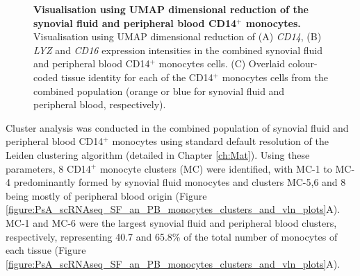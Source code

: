 \begin{figure}[H]
\begin{subfigure}[b]{0.45\textwidth}
\end{subfigure}
\caption[Visualisation using UMAP dimensional reduction of the synovial fluid and peripheral blood CD14$^+$ monocytes.]{\textbf{Visualisation using UMAP dimensional reduction of the synovial fluid and peripheral blood CD14$^+$ monocytes.} Visualisation using UMAP dimensional reduction of (A) \textit{CD14}, (B) \textit{LYZ} and \textit{CD16} expression intensities in the combined synovial fluid and peripheral blood CD14$^+$ monocytes cells. (C) Overlaid colour-coded tissue identity for each of the CD14$^+$ monocytes cells from the combined population (orange or blue for synovial fluid and peripheral blood, respectively).}
\label{figure:PsA_scRNAseq_SF_an_PB_monocytes_markers_and_tissue_identity}
\end{figure}

Cluster analysis was conducted in the combined population of synovial fluid and peripheral blood CD14$^+$ monocytes using standard default resolution of the Leiden clustering algorithm (detailed in Chapter \ref{ch:Mat}). Using these parameters, 8 CD14$^+$ monocyte clusters (MC) were identified, with MC-1 to MC-4 predominantly formed by synovial fluid monocytes and clusters MC-5,6 and 8  being mostly of peripheral blood origin (Figure \ref{figure:PsA_scRNAseq_SF_an_PB_monocytes_clusters_and_vln_plots}A). MC-1 and MC-6 were the largest synovial fluid and peripheral blood clusters, respectively, representing 40.7 and 65.8\% of the total number of monocytes of each tissue (Figure \ref{figure:PsA_scRNAseq_SF_an_PB_monocytes_clusters_and_vln_plots}A). 

